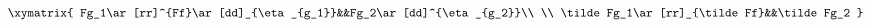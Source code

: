 \begin{equation}
\begin{aligned}
\xymatrix{
  Fg_1\ar[rr]^{Ff}\ar[dd]_{\eta_{g_1}}&&Fg_2\ar[dd]^{\eta_{g_2}}\\
  \\
  \tilde Fg_1\ar[rr]_{\tilde Ff}&&\tilde Fg_2
}
\end{aligned}
\end{equation}

